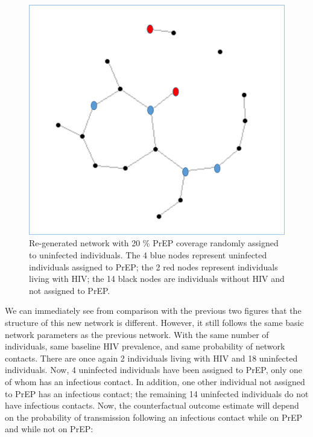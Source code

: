 \documentclass{article}
\theoremstyle{definition}
\begin{document}
\begin{figure}[H]
    \centering
    \includegraphics[scale=0.5]{Original Figures/Network Example 5.png}
    \caption{Re-generated network with 20 \% PrEP coverage randomly assigned to uninfected individuals. The 4 blue nodes represent uninfected individuals assigned to PrEP; the 2 red nodes represent individuals living with HIV; the 14 black nodes are individuals without HIV and not assigned to PrEP. }
    \label{fig:Figure 6}
\end{figure}

We can immediately see from comparison with the previous two figures that the structure of this new network is different. However, it still follows the same basic network parameters as the previous network. With the same number of individuals, same baseline HIV prevalence, and same probability of network contacts. There are once again 2 individuals living with HIV and 18 uninfected individuals. Now, 4 uninfected individuals have been assigned to PrEP, only one of whom has an infectious contact. In addition, one other individual not assigned to PrEP has an infectious contact; the remaining 14 uninfected individuals do not have infectious contacts. Now, the counterfactual outcome estimate will depend on the probability of transmission following an infectious contact while on PrEP and while not on PrEP:
\end{document}
